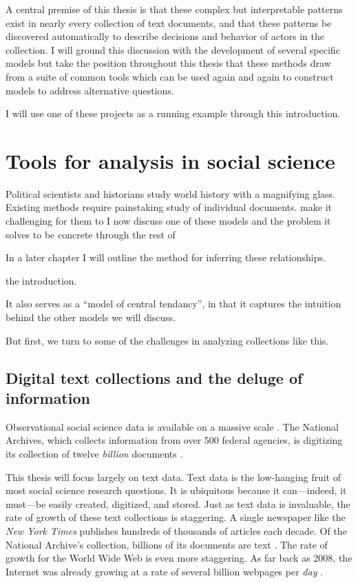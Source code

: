 A central premise of this thesis is that these complex but
interpretable patterns exist in nearly every collection of text
documents, and that these patterns be discovered automatically to
describe decisions and behavior of actors in the collection.  I will
ground this discussion with the development of several specific models
but take the position throughout this thesis that these methods draw
from a suite of common tools which can be used again and again to
construct models to address alternative questions.

I will use one of these projects as a running example through this
introduction.

\section*{Tools for analysis in social science}

Political scientists and historians study world history with a
magnifying glass.  Existing methods require painstaking study of
individual documents.   make it challenging for them to I now discuss one of these
models and the problem it solves to be concrete through the rest of

In a later chapter I will outline the method for inferring these relationships.

the introduction.

It also serves as a ``model of central
tendancy'', in that it captures the intuition behind the other models
we will discuss.


But first, we turn to some of the challenges in analyzing collections like this.

\subsection*{Digital text collections and the deluge of information}
Observational social science data is available on a massive scale
\cite{lazer:2009}. The National Archives, which collects information
from over 500 federal agencies, is digitizing its collection of twelve
\emph{billion} documents
\cite{national_archives:2012a,national_archives:2012b}.

This thesis will focus largely on text data.  Text data is the
low-hanging fruit of most social science research questions.  It is
ubiquitous because it can---indeed, it must---be easily created,
digitized, and stored.  Just as text data is invaluable, the rate of
growth of these text collections is staggering.  A single newspaper
like the \emph{New York Times} publishes hundreds of thousands of
articles each decade.  Of the National Archive's collection, billions
of its documents are text
\cite{national_archives:2012a,national_archives:2012b}.  The rate of
growth for the World Wide Web is even more staggering.  As far back as
2008, the Internet was already growing at a rate of several billion
webpages per \emph{day} \cite{googleblog:2008}.


